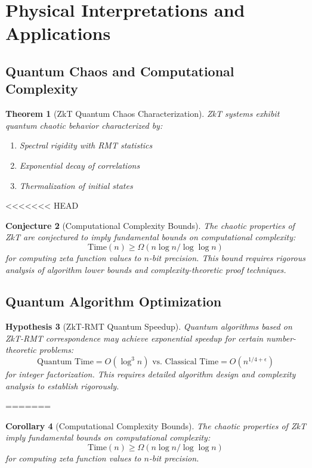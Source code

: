 \documentclass[12pt]{article}
\theoremstyle{plain}
\newtheorem{theorem}{Theorem}[section]
\newtheorem{corollary}[theorem]{Corollary}
\newtheorem{hypothesis}[theorem]{Hypothesis}
\newtheorem{conjecture}[theorem]{Conjecture}
\theoremstyle{definition}
\begin{document}
\section{Physical Interpretations and Applications}

\subsection{Quantum Chaos and Computational Complexity}

\begin{theorem}[ZkT Quantum Chaos Characterization]
ZkT systems exhibit quantum chaotic behavior characterized by:
\begin{enumerate}
\item Spectral rigidity with RMT statistics
\item Exponential decay of correlations
\item Thermalization of initial states
\end{enumerate}
\end{theorem}

<<<<<<< HEAD
\begin{conjecture}[Computational Complexity Bounds]
The chaotic properties of ZkT are conjectured to imply fundamental bounds on computational complexity:
\begin{equation}
\text{Time}(n) \geq \Omega(n \log n / \log \log n)
\end{equation}
for computing zeta function values to $n$-bit precision. This bound requires rigorous analysis of algorithm lower bounds and complexity-theoretic proof techniques.
\end{conjecture}

\subsection{Quantum Algorithm Optimization}

\begin{hypothesis}[ZkT-RMT Quantum Speedup]
Quantum algorithms based on ZkT-RMT correspondence may achieve exponential speedup for certain number-theoretic problems:
\begin{equation}
\text{Quantum Time} = O(\log^3 n) \text{ vs. Classical Time} = O(n^{1/4+\epsilon})
\end{equation}
for integer factorization. This requires detailed algorithm design and complexity analysis to establish rigorously.
\end{hypothesis}
=======
\begin{corollary}[Computational Complexity Bounds]
The chaotic properties of ZkT imply fundamental bounds on computational complexity:
\begin{equation}
\text{Time}(n) \geq \Omega(n \log n / \log \log n)
\end{equation}
for computing zeta function values to $n$-bit precision.
\end{corollary}
\end{document}
